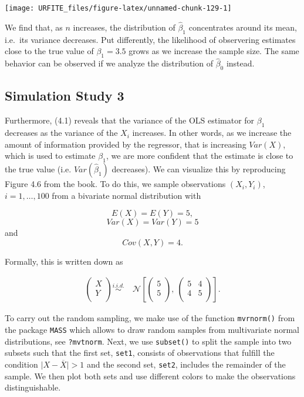 \documentclass[]{book}
\theoremstyle{definition}
\theoremstyle{definition}
\theoremstyle{definition}
\theoremstyle{remark}
\begin{document}
\begin{center}\texttt{[image: URFITE\_files/figure-latex/unnamed-chunk-129-1]} \end{center}

We find that, as \(n\) increases, the distribution of \(\hat\beta_1\)
concentrates around its mean, i.e.~its variance decreases. Put
differently, the likelihood of observering estimates close to the true
value of \(\beta_1 = 3.5\) grows as we increase the sample size. The
same behavior can be observed if we analyze the distribution of
\(\hat\beta_0\) instead.

\subsection*{Simulation Study 3}\label{simulation-study-3}

Furthermore, (4.1) reveals that the variance of the OLS estimator for
\(\beta_1\) decreases as the variance of the \(X_i\) increases. In other
words, as we increase the amount of information provided by the
regressor, that is increasing \(Var(X)\), which is used to estimate
\(\beta_1\), we are more confident that the estimate is close to the
true value (i.e. \(Var(\hat\beta_1)\) decreases). We can visualize this
by reproducing Figure 4.6 from the book. To do this, we sample
observations \((X_i,Y_i)\), \(i=1,\dots,100\) from a bivariate normal
distribution with

\[E(X)=E(Y)=5,\] \[Var(X)=Var(Y)=5\] and \[Cov(X,Y)=4.\]

Formally, this is written down as

\begin{align}
  \begin{pmatrix}
    X \\
    Y \\
  \end{pmatrix}
  \overset{i.i.d.}{\sim} & \ \mathcal{N} 
  \left[
    \begin{pmatrix}
      5 \\
      5 \\
    \end{pmatrix}, \ 
    \begin{pmatrix}
      5 & 4 \\
      4 & 5 \\
    \end{pmatrix}
  \right]. \tag{4.3}
\end{align}

To carry out the random sampling, we make use of the function
\texttt{mvrnorm()} from the package \texttt{MASS} which allows to draw
random samples from multivariate normal distributions, see
\texttt{?mvtnorm}. Next, we use \texttt{subset()} to split the sample
into two subsets such that the first set, \texttt{set1}, consists of
observations that fulfill the condition
\(\lvert X - \overline{X} \rvert > 1\) and the second set,
\texttt{set2}, includes the remainder of the sample. We then plot both
sets and use different colors to make the observations distinguishable.
\end{document}
